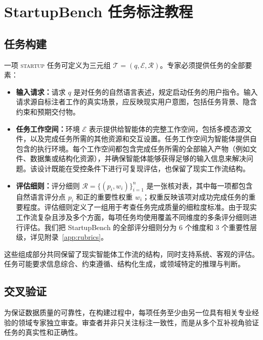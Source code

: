 \section{StartupBench 任务标注教程}

\subsection{任务构建}
\label{app:task_construction}

一项 \textsc{startup} 任务可定义为三元组 $\mathcal{T}=(q,\mathcal{E},\mathcal{R})$。专家必须提供任务的全部要素：

\begin{itemize}
    \item \textbf{输入请求：}请求 $q$ 是对任务的自然语言表述，规定启动任务的用户指令。输入请求源自标注者工作的真实场景，应反映现实用户意图，包括任务背景、隐含约束和预期交付物。

    \item \textbf{任务工作空间：}环境 $\mathcal{E}$ 表示提供给智能体的完整工作空间，包括多模态源文件，以及完成任务所需的其他资源和交互设置。任务工作空间为智能体提供自包含的执行环境。每个工作空间都包含完成任务所需的全部输入产物（例如文件、数据集或结构化资源），并确保智能体能够获得足够的输入信息来解决问题。该设计既能在受控条件下进行可复现评估，也保留了现实工作流结构。

    \item \textbf{评估细则：}评分细则 $\mathcal{R}=\{(p_i,w_i)\}_{i=1}^{n}$ 是一张核对表，其中每一项都包含自然语言评分点 $p_i$ 和正的重要性权重 $w_i$；权重反映该项对成功完成任务的重要程度。评估细则定义了一组用于考查任务完成质量的细粒度标准。由于现实工作流复杂且涉及多个方面，每项任务均使用覆盖不同维度的多条评分细则进行评估。我们把 StartupBench 的全部评分细则分为 6 个维度和 3 个重要性层级，详见附录~\ref{app:rubrics}。
\end{itemize}

这些组成部分共同保留了现实智能体工作流的结构，同时支持系统、客观的评估。任务可能要求信息综合、约束遵循、结构化生成，或领域特定的推理与判断。

\subsection{交叉验证}
\label{app:cross_valid}

为保证数据质量的可靠性，在构建过程中，每项任务至少由另一位具有相关专业经验的领域专家独立审查。审查者并非只关注标注一致性，而是从多个互补视角验证任务的真实性和正确性。

